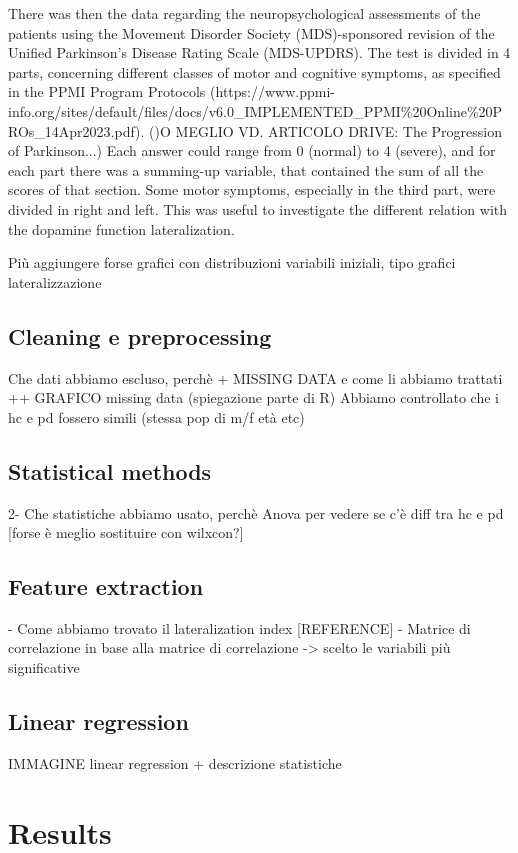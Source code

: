 \documentclass[]{article}
\begin{document}
\begin{multicols}{2}
There was then the data regarding the neuropsychological assessments of the patients using the Movement Disorder Society (MDS)-sponsored revision of the Unified Parkinson's Disease Rating Scale (MDS-UPDRS). The test is divided in 4 parts, concerning different classes of motor and cognitive symptoms, as specified in the PPMI Program Protocols (https://www.ppmi-info.org/sites/default/files/docs/v6.0\_IMPLEMENTED\_PPMI\%20Online\%20PROs\_14Apr2023.pdf). ()O MEGLIO VD. ARTICOLO DRIVE: The Progression of Parkinson...) Each answer could range from 0 (normal) to 4 (severe), and for each part there was a summing-up variable, that contained the sum of all the scores of that section. Some motor symptoms, especially in the third part, were divided in right and left. This was useful to investigate the different relation with the dopamine function lateralization.
\newline

Più aggiungere forse grafici con distribuzioni variabili iniziali, tipo grafici lateralizzazione
\subsection{Cleaning e preprocessing}
Che dati abbiamo escluso, perchè + MISSING DATA  e come li abbiamo trattati
++ GRAFICO missing data (spiegazione parte di R)
Abbiamo controllato che i hc e pd fossero simili (stessa pop di m/f età etc)
\subsection{Statistical methods}
2- Che statistiche abbiamo usato, perchè
Anova per vedere se c'è diff tra hc e pd [forse è meglio sostituire con wilxcon?]
\subsection{Feature extraction}
- Come abbiamo trovato il lateralization index [REFERENCE]
- Matrice di correlazione
in base alla matrice di correlazione ->  scelto le variabili più significative
\subsection{Linear regression}
IMMAGINE linear regression + descrizione statistiche 

\section{Results}


\end{multicols}
\end{document}
